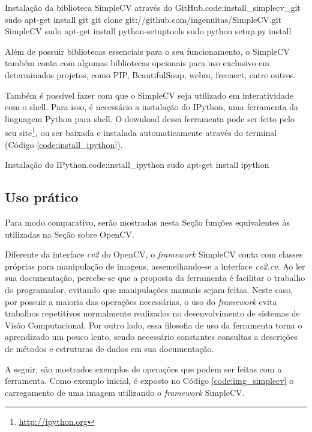 \begin{terminal}{Instalação da biblioteca SimpleCV através do GitHub.}{code:install_simplecv_git}
sudo apt-get install git
git clone git://github.com/ingenuitas/SimpleCV.git SimpleCV
sudo apt-get install python-setuptools
sudo python setup.py install
\end{terminal}

Além de possuir bibliotecas essenciais para o seu funcionamento, o SimpleCV também conta com algumas bibliotecas opcionais para uso exclusivo em determinados projetos, como PIP, BeautifulSoup, webm, freenect, entre outros.

Também é possível fazer com que o SimpleCV seja utilizado em interatividade com o shell. Para isso, é necessário a instalação do IPython, uma ferramenta da linguagem Python para shell. O download dessa ferramenta pode ser feito pelo seu site\footnote{\url{http://ipython.org}}, ou ser baixada e instalada automaticamente através do terminal (Código \ref{code:install_ipython}).

\begin{terminal}{Instalação do IPython.}{code:install_ipython}
sudo apt-get install ipython
\end{terminal}

\subsection{Uso prático}

Para modo comparativo, serão mostradas nesta Seção funções equivalentes às utilizadas na Seção sobre OpenCV.

Diferente da interface \textit{cv2} do OpenCV, o \textit{framework} SimpleCV conta com classes próprias para manipulação de imagens, assemelhando-se a interface \textit{cv2.cv}. Ao ler sua documentação, percebe-se que a proposta da ferramenta é facilitar o trabalho do programador, evitando que manipulações manuais sejam feitas. Neste caso, por possuir a maioria das operações necessárias, o uso do \textit{framework} evita trabalhos repetitivos normalmente realizados no desenvolvimento de sistemas de Visão Computacional. Por outro lado, essa filosofia de uso da ferramenta torna o aprendizado um pouco lento, sendo necessário constantes consultas a descrições de métodos e estruturas de dados em sua documentação.

A seguir, são mostrados exemplos de operações que podem ser feitas com a ferramenta. Como exemplo inicial, é exposto no Código \ref{code:img_simplecv} o carregamento de uma imagem utilizando o \textit{framework} SimpleCV.

